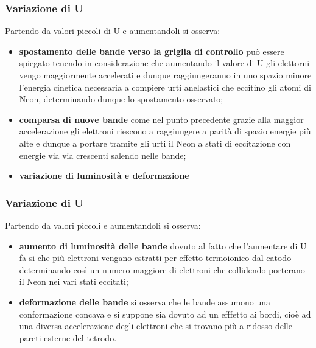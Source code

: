 \documentclass[10pt,a4paper]{article}
\begin{document}
\subsubsection*{Variazione di U}
Partendo da valori piccoli di U e aumentandoli si osserva:
\begin{itemize}
\item [] \textbf{spostamento delle bande verso la griglia di controllo} può essere spiegato tenendo in considerazione che aumentando il valore di U gli elettorni vengo maggiormente accelerati e dunque raggiungeranno in uno spazio minore l'energia cinetica necessaria a compiere urti anelastici che eccitino gli atomi di Neon, determinando dunque lo spostamento osservato; 
\item [] \textbf{comparsa di nuove bande} come nel punto precedente grazie alla maggior accelerazione gli elettroni riescono a raggiungere a parità di spazio energie più alte e dunque a portare tramite gli urti il Neon a stati di eccitazione con energie via via crescenti salendo nelle bande;
\item [] \textbf{variazione di luminosità e deformazione} %
\end{itemize}
\subsubsection*{Variazione di U}
Partendo da valori piccoli e aumentandoli si osserva:
\begin{itemize}
\item [] \textbf{aumento di luminosità delle bande} dovuto al fatto che l'aumentare di U fa si che più elettroni vengano estratti per effetto termoionico dal catodo determinando così un numero maggiore di elettroni che collidendo porterano il Neon nei vari stati eccitati;
\item [] \textbf{deformazione delle bande} si osserva che le bande assumono una conformazione concava e si suppone sia dovuto ad un efffetto ai bordi, cioè ad una diversa accelerazione degli elettroni che si trovano più a ridosso delle pareti esterne del tetrodo.
\end{itemize}
\end{document}
